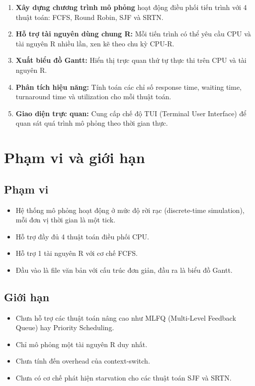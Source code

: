 \begin{enumerate}
    \item \textbf{Xây dựng chương trình mô phỏng} hoạt động điều phối tiến trình với 4 thuật toán: FCFS, Round Robin, SJF và SRTN.
    \item \textbf{Hỗ trợ tài nguyên dùng chung R:} Mỗi tiến trình có thể yêu cầu CPU và tài nguyên R nhiều lần, xen kẽ theo chu kỳ CPU-R.
    \item \textbf{Xuất biểu đồ Gantt:} Hiển thị trực quan thứ tự thực thi trên CPU và tài nguyên R.
    \item \textbf{Phân tích hiệu năng:} Tính toán các chỉ số response time, waiting time, turnaround time và utilization cho mỗi thuật toán.
    \item \textbf{Giao diện trực quan:} Cung cấp chế độ TUI (Terminal User Interface) để quan sát quá trình mô phỏng theo thời gian thực.
\end{enumerate}

\section{Phạm vi và giới hạn}

\subsection{Phạm vi}
\begin{itemize}
    \item Hệ thống mô phỏng hoạt động ở mức độ rời rạc (discrete-time simulation), mỗi đơn vị thời gian là một tick.
    \item Hỗ trợ đầy đủ 4 thuật toán điều phối CPU.
    \item Hỗ trợ 1 tài nguyên R với cơ chế FCFS.
    \item Đầu vào là file văn bản với cấu trúc đơn giản, đầu ra là biểu đồ Gantt.
\end{itemize}

\subsection{Giới hạn}
\begin{itemize}
    \item Chưa hỗ trợ các thuật toán nâng cao như MLFQ (Multi-Level Feedback Queue) hay Priority Scheduling.
    \item Chỉ mô phỏng một tài nguyên R duy nhất.
    \item Chưa tính đến overhead của context-switch.
    \item Chưa có cơ chế phát hiện starvation cho các thuật toán SJF và SRTN.
\end{itemize}


